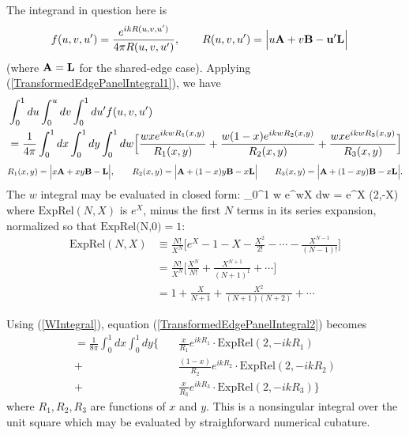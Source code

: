 \documentclass[letterpaper]{article}
\begin{document}
The integrand in question here is 
\begin{align*}
 f(u,v,u^\prime)
&=\frac{e^{ikR(u,v,u^\prime)}}{4\pi R(u,v,u^\prime)},
\qquad 
 R(u,v,u^\prime)=\Big|u\mathbf{A} + v\mathbf{B} - \mathbf{u}^\prime \mathbf{L}\Big|
\end{align*}
(where $\mathbf{A}=\mathbf{L}$ for the shared-edge case).
Applying (\ref{TransformedEdgePanelIntegral1}), we have
\begin{align}
&\int_0^1 du \int_0^u dv \int_0^1 du^\prime f(u,v,u^\prime)
\nonumber \\
&=\frac{1}{4\pi}\int_0^1 dx \int_0^1 dy \int_0^1 dw
\Big[  \frac{ w x     e^{ikwR_1(x,y)}}{R_1(x,y)} 
     + \frac{ w (1-x) e^{ikwR_2(x,y)}}{R_2(x,y)} 
     + \frac{ w x     e^{ikwR_3(x,y)}}{R_3(x,y)}
\Big] 
\label{TransformedEdgePanelIntegral2}
\end{align}
$$ R_1(x,y)=\Big| x\mathbf{A} + xy \mathbf{B} - \mathbf{L} \Big|,
   \qquad
   R_2(x,y)=\Big| \mathbf{A} + (1-x)y \mathbf{B} - x\mathbf{L} \Big|
   \qquad
   R_3(x,y)=\Big| \mathbf{A} + (1-xy) \mathbf{B} - x\mathbf{L} \Big|.
$$
The $w$ integral may be evaluated in closed form:
{\int_0^1 w e^{wX} dw  = e^X \cdot {}(2,-X)}
where $\text{ExpRel}(N,X)$ is 
$e^X$, minus the first $N$ terms in its series expansion,
normalized so that $\text{ExpRel(N,0)}=1$:
\begin{align*}
 \text{ExpRel}(N,X) &\equiv
   \frac{N!}{X^N}\Big[e^{X} - 1 - X - \frac{X^2}{2!} - \cdots 
                             - \frac{X^{N-1}}{(N-1)!} \Big]
\\
&=
   \frac{N!}{X^N}\Big[\frac{X^N}{N!} + \frac{X^{N+1}}{(N+1)^1} + \cdots\Big] 
\\
&=
   1 + \frac{X}{N+1} + \frac{X^2}{(N+1)(N+2)} + \cdots
\end{align*}

Using (\ref{WIntegral}), equation (\ref{TransformedEdgePanelIntegral2})
becomes 
\begin{align*}
=\frac{1}{8\pi}\int_0^1 dx \int_0^1 dy \bigg\{
 \quad &\frac{x}{R_1} e^{ikR_1} \cdot \text{ExpRel}(2,-ikR_1)
\\
      +&\frac{(1-x)}{R_2} e^{ikR_2} \cdot \text{ExpRel}(2,-ikR_2)
\\
      +&\frac{x}{R_3}e^{ikR_3} \cdot \text{ExpRel}(2,-ikR_3)
  \bigg\}
\end{align*}
where $R_1, R_2, R_3$ are functions of $x$ and $y$. This is a nonsingular
integral over the unit square which may be evaluated by straighforward
numerical cubature.
\end{document}
